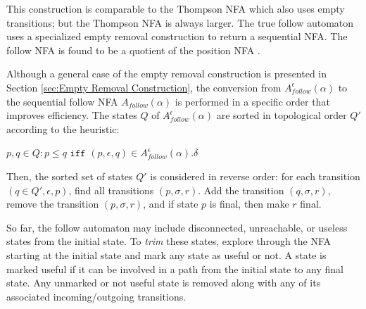 This construction is comparable to the Thompson NFA which also uses empty transitions; but the Thompson NFA is always larger. The true follow automaton uses a specialized empty removal construction to return a sequential NFA. The follow NFA is found to be a quotient of the position NFA \cite{follow}.

Although a general case of the empty removal construction is presented in Section \ref{sec:Empty Removal Construction}, the conversion from $A_{follow}^\epsilon(\alpha)$ to the sequential follow NFA $A_{follow}(\alpha)$ is performed in a specific order that improves efficiency. The states $Q$ of $A_{follow}^\epsilon(\alpha)$ are sorted in topological order $Q'$ according to the heuristic:
\begin{center}
  $p, q \in Q: p \leq q \texttt{ iff } (p, \epsilon, q) \in A_{follow}^\epsilon(\alpha).\delta$  
\end{center}
Then, the sorted set of states $Q'$ is considered in reverse order: for each transition $(q \in Q', \epsilon, p)$, find all transitions $(p, \sigma, r)$. Add the transition $(q, \sigma, r)$, remove the transition $(p, \sigma, r)$, and if state $p$ is final, then make $r$ final.

So far, the follow automaton may include disconnected, unreachable, or useless states from the initial state. To \emph{trim} these states, explore through the NFA starting at the initial state and mark any state as useful or not. A state is marked useful if it can be involved in a path from the initial state to any final state. Any unmarked or not useful state is removed along with any of its associated incoming/outgoing transitions. 

